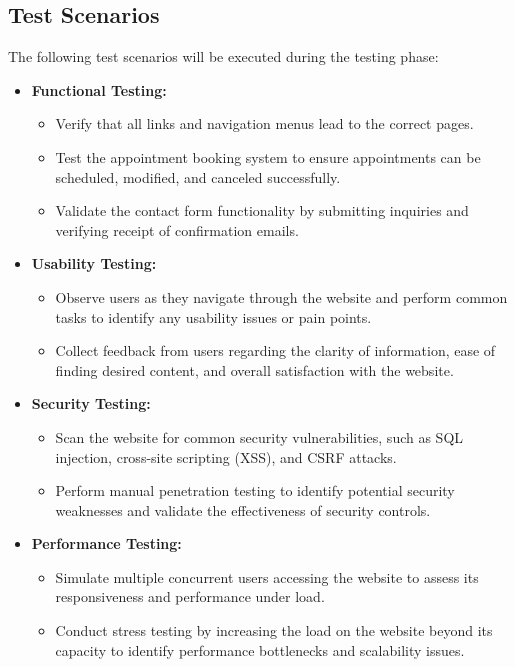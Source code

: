 \documentclass{article}
\begin{document}
\subsection{Test Scenarios}
The following test scenarios will be executed during the testing phase:
\begin{itemize}
    \item \textbf{Functional Testing:}
        \begin{itemize}
            \item Verify that all links and navigation menus lead to the correct pages.
            \item Test the appointment booking system to ensure appointments can be scheduled, modified, and canceled successfully.
            \item Validate the contact form functionality by submitting inquiries and verifying receipt of confirmation emails.
        \end{itemize}
    \item \textbf{Usability Testing:}
        \begin{itemize}
            \item Observe users as they navigate through the website and perform common tasks to identify any usability issues or pain points.
            \item Collect feedback from users regarding the clarity of information, ease of finding desired content, and overall satisfaction with the website.
        \end{itemize}
    \item \textbf{Security Testing:}
        \begin{itemize}
            \item Scan the website for common security vulnerabilities, such as SQL injection, cross-site scripting (XSS), and CSRF attacks.
            \item Perform manual penetration testing to identify potential security weaknesses and validate the effectiveness of security controls.
        \end{itemize}
    \item \textbf{Performance Testing:}
        \begin{itemize}
            \item Simulate multiple concurrent users accessing the website to assess its responsiveness and performance under load.
            \item Conduct stress testing by increasing the load on the website beyond its capacity to identify performance bottlenecks and scalability issues.
        \end{itemize}
\end{itemize}
\end{document}
